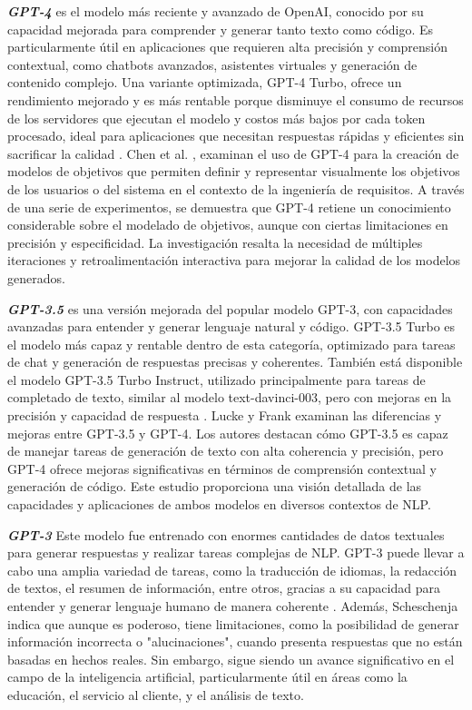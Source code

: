 \textit{\textbf{GPT-4}} es el modelo más reciente y avanzado de OpenAI, conocido por su capacidad mejorada para comprender y generar tanto texto como código. Es particularmente útil en aplicaciones que requieren alta precisión y comprensión contextual, como chatbots avanzados, asistentes virtuales y generación de contenido complejo. Una variante optimizada, GPT-4 Turbo, ofrece un rendimiento mejorado y es más rentable porque disminuye el consumo de recursos de los servidores que ejecutan el modelo y costos más bajos por cada token procesado, ideal para aplicaciones que necesitan respuestas rápidas y eficientes sin sacrificar la calidad \cite{Elon2024}. Chen et al. \cite{Chen2023}, examinan el uso de GPT-4 para la creación de modelos de objetivos que permiten definir y representar visualmente los objetivos de los usuarios o del sistema en el contexto de la ingeniería de requisitos. A través de una serie de experimentos, se demuestra que GPT-4 retiene un conocimiento considerable sobre el modelado de objetivos, aunque con ciertas limitaciones en precisión y especificidad. La investigación resalta la necesidad de múltiples iteraciones y retroalimentación interactiva para mejorar la calidad de los modelos generados.

\textbf{\textit{GPT-3.5}} es una versión mejorada del popular modelo GPT-3, con capacidades avanzadas para entender y generar lenguaje natural y código. GPT-3.5 Turbo es el modelo más capaz y rentable dentro de esta categoría, optimizado para tareas de chat y generación de respuestas precisas y coherentes. También está disponible el modelo GPT-3.5 Turbo Instruct, utilizado principalmente para tareas de completado de texto, similar al modelo text-davinci-003, pero con mejoras en la precisión y capacidad de respuesta \cite{Elon2024}. Lucke y Frank  \cite{Lucke2024} examinan las diferencias y mejoras entre GPT-3.5 y GPT-4. Los autores destacan cómo GPT-3.5 es capaz de manejar tareas de generación de texto con alta coherencia y precisión, pero GPT-4 ofrece mejoras significativas en términos de comprensión contextual y generación de código. Este estudio proporciona una visión detallada de las capacidades y aplicaciones de ambos modelos en diversos contextos de NLP.

\textbf{\textit{GPT-3}} Este modelo fue entrenado con enormes cantidades de datos textuales para generar respuestas y realizar tareas complejas de NLP. GPT-3 puede llevar a cabo una amplia variedad de tareas, como la traducción de idiomas, la redacción de textos, el resumen de información, entre otros, gracias a su capacidad para entender y generar lenguaje humano de manera coherente \cite{Scheschenja2024}. Además, Scheschenja \cite{Scheschenja2024} indica que aunque es poderoso, tiene limitaciones, como la posibilidad de generar información incorrecta o "alucinaciones", cuando presenta respuestas que no están basadas en hechos reales. Sin embargo, sigue siendo un avance significativo en el campo de la inteligencia artificial, particularmente útil en áreas como la educación, el servicio al cliente, y el análisis de texto.

